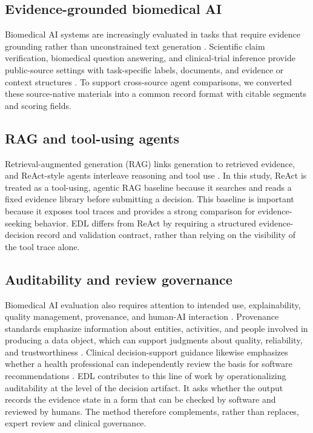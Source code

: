 \documentclass[11pt,a4paper]{article}
\begin{document}
\subsection{Evidence-grounded biomedical AI}

Biomedical AI systems are increasingly evaluated in tasks that require evidence grounding rather than unconstrained text generation \cite{rajpurkar2022health,topol2019highperformance,esteva2019deep}. Scientific claim verification, biomedical question answering, and clinical-trial inference provide public-source settings with task-specific labels, documents, and evidence or context structures \cite{wadden2020scifact,jin2019pubmedqa,jullien2023nli4ct}. To support cross-source agent comparisons, we converted these source-native materials into a common record format with citable segments and scoring fields.

\subsection{RAG and tool-using agents}

Retrieval-augmented generation (RAG) links generation to retrieved evidence, and ReAct-style agents interleave reasoning and tool use \cite{lewis2020rag,yao2023react}. In this study, ReAct is treated as a tool-using, agentic RAG baseline because it searches and reads a fixed evidence library before submitting a decision. This baseline is important because it exposes tool traces and provides a strong comparison for evidence-seeking behavior. EDL differs from ReAct by requiring a structured evidence-decision record and validation contract, rather than relying on the visibility of the tool trace alone.

\subsection{Auditability and review governance}

Biomedical AI evaluation also requires attention to intended use, explainability, quality management, provenance, and human-AI interaction \cite{mcnamara2024clinicianai,overgaard2023qms,castner2024expertgaze,wekenborg2025humanai}. Provenance standards emphasize information about entities, activities, and people involved in producing a data object, which can support judgments about quality, reliability, and trustworthiness \cite{w3cprov2013}. Clinical decision-support guidance likewise emphasizes whether a health professional can independently review the basis for software recommendations \cite{fda2022cds}. EDL contributes to this line of work by operationalizing auditability at the level of the decision artifact. It asks whether the output records the evidence state in a form that can be checked by software and reviewed by humans. The method therefore complements, rather than replaces, expert review and clinical governance.
\end{document}

